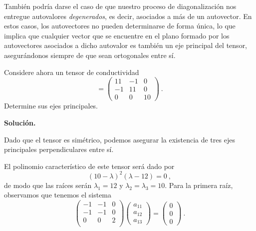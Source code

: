 También podría darse el caso de que nuestro proceso de diagonalización nos entregue autovalores \emph{degenerados}, es decir, asociados a más de un autovector. En estos casos, los autovectores no pueden determinarse de forma única, lo que implica que cualquier vector que se encuentre en el plano formado por los autovectores asociados a dicho autovalor es también un eje principal del tensor, asegurándonos siempre de que sean ortogonales entre sí.

\begin{ejemplo}
    Considere ahora un tensor de conductividad
    \begin{equation*}
        [\sigma_{ij}] = \begin{pmatrix}
            11 & -1 & 0 \\
            -1 & 11 & 0 \\
            0 & 0 & 10
        \end{pmatrix} \ .
    \end{equation*}
    Determine sus ejes principales.

    \textbf{Solución.}

    Dado que el tensor es simétrico, podemos asegurar la existencia de tres ejes principales perpendiculares entre sí.

    El polinomio característico de este tensor será dado por 
    \begin{equation*}
        (10 - \lambda)^2(\lambda - 12) = 0 \ ,
    \end{equation*}
    de modo que las raíces serán $\lambda_1 = 12$ y $\lambda_2 = \lambda_3 = 10$. Para la primera raíz, observamos que tenemos el sistema 
    \begin{equation*}
        \begin{pmatrix}
            -1 & -1 & 0 \\
            -1 & -1 & 0 \\
            0 & 0 & 2 \\
        \end{pmatrix}
        \begin{pmatrix}
            a_{11} \\ a_{12} \\ a_{13}
        \end{pmatrix}
        = \begin{pmatrix}
            0 \\ 0 \\ 0
        \end{pmatrix} \ .
    \end{equation*}


\end{ejemplo}
